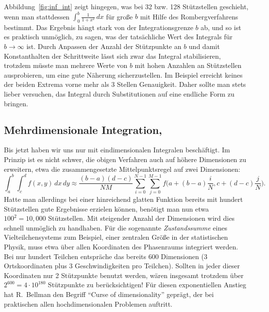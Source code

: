Abbildung~\ref{fig:inf_int} zeigt hingegen, was bei 32 bzw. 128
Stützstellen geschieht, wenn man stattdessen $\int_0^b
\frac{1}{1+x^2}\, dx$ für große $b$ mit Hilfe des Rombergverfahrens
bestimmt. Das Ergebnis hängt stark von der Integrationsgrenze $b$ ab,
und so ist es praktisch unmöglich, zu sagen, was der tatsächliche Wert
des Integrals für $b \rightarrow \infty$ ist. Durch Anpassen der
Anzahl der Stützpunkte an $b$ und damit Konstanthalten der
Schrittweite lässt sich zwar das Integral stabilisieren, trotzdem
müsste man mehrere Werte von $b$ mit hohen Anzahlen an Stützstellen
ausprobieren, um eine gute Näherung sicherzustellen. Im Beispiel
erreicht keines der beiden Extrema vorne mehr als 3 Stellen
Genauigkeit. Daher sollte man stets lieber versuchen, das Integral
durch Substitutionen auf eine endliche Form zu bringen.

\subsection{Mehrdimensionale Integration, }
\label{sec:mc}

Bis jetzt haben wir uns nur mit eindimensionalen Integralen
beschäftigt. Im Prinzip ist es nicht schwer, die obigen Verfahren auch
auf höhere Dimensionen zu erweitern, etwa die zusammengesetzte 
Mittelpunktsregel auf zwei Dimensionen:
\begin{equation}
  \int_a^b \int_c^d f(x, y)\, dx\, dy \approx
  \frac{(b-a)(d-c)}{NM} \sum_{i=0}^{N-1} \sum_{j=0}^{M-1}
  f\bigl(a + (b-a)\frac{i}{N}, c + (d-c)\frac{j}{N}\bigr).
\end{equation}
Hatte man allerdings bei einer hinreichend glatten Funktion bereits
mit hundert Stützstellen gute Ergebnisse erzielen können, benötigt man
nun etwa $100^2=10,000$ Stützstellen.  Mit steigender Anzahl der
Dimensionen wird dies schnell unmöglich zu handhaben. Für die
sogenannte \emph{Zustandssumme} eines Vielteilchensystems zum
Beispiel, einer zentralen Größe in der statistischen Physik, muss etwa
über allen Koordinaten des Phasenraums integriert werden.  Bei nur
hundert Teilchen entspräche das bereits 600 Dimensionen ($3$
Ortskoordinaten plus $3$ Geschwindigkeiten pro Teilchen). Sollten in
jeder dieser Koordinaten nur 2 Stützpunkte benutzt werden, wären
insgesamt trotzdem über $2^{600}= 4\cdot 10^{180}$ Stützpunkte zu
berücksichtigen! Für diesen exponentiellen Anstieg hat R.~Bellman den
Begriff "`Curse of dimensionality"' geprägt, der bei praktischen allen
hochdimensionalen Problemen auftritt.

